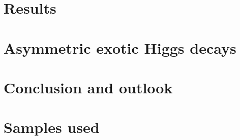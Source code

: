 \documentclass[12pt,lot,lof]{puthesis}
\begin{document}
\chapter{Results}


\chapter{Asymmetric exotic Higgs decays}


\chapter{Conclusion and outlook}


\appendix
\chapter{Samples used}
\label{appendix-a:samples}


 \label{bib}
\end{document}
